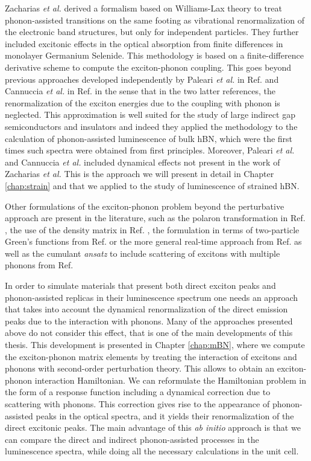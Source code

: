 Zacharias \textit{et al.} derived a formalism based on Williams-Lax theory\cite{williams1951theoretical,lax1952franck} to treat phonon-assisted transitions on the same footing as vibrational renormalization of the electronic band structures, but only for independent particles.\cite{zacharias2016one} They further included excitonic effects in the optical absorption from finite differences \cite{huang2021exciton} in monolayer Germanium Selenide. This methodology is based on a finite-difference derivative scheme to compute the exciton-phonon coupling. This goes beyond previous approaches developed independently by Paleari \textit{et al.} in Ref. \cite{paleari2019exciton} and Cannuccia \textit{et al.} in Ref. \cite{cannuccia2019theory} in the sense that in the two latter references, the renormalization of the exciton energies due to the coupling with phonon is neglected. This approximation is well suited for the study of large indirect gap semiconductors and insulators and indeed they applied the methodology to the calculation of phonon-assisted luminescence of bulk hBN, which were the first times such spectra were obtained from first principles. Moreover, Paleari \textit{et al.} and Cannuccia \textit{et al.} included dynamical effects not present in the work of Zacharias \textit{et al.} This is the approach we will present in detail in Chapter \ref{chap:strain} and that we applied to the study of luminescence of strained hBN. 

Other formulations of the exciton-phonon problem beyond the perturbative approach are present in the literature, such as the polaron transformation in Ref. \cite{feldtmann2009phonon}, the use of the density matrix in Ref. \cite{brem2020phonon}, the formulation in terms of two-particle Green's functions from Ref. \cite{antonius2017theory} or the more general real-time approach from Ref. \cite{paleari2022exciton} as well as the cumulant \textit{ansatz} to include scattering of excitons with multiple phonons from Ref. \cite{cudazzo2020first} 

In order to simulate materials that present both direct exciton
peaks and phonon-assisted replicas in their luminescence spectrum one needs an approach that takes into account the dynamical renormalization of the direct emission peaks due
to the interaction with phonons. Many of the approaches presented above do not consider this effect, that is one of the main developments of this thesis.
This development is presented in Chapter \ref{chap:mBN}, where we compute the exciton-phonon matrix elements by treating the interaction of excitons and phonons with second-order perturbation theory. This allows to obtain an exciton-phonon interaction Hamiltonian. We can reformulate the Hamiltonian problem in the form of a response function including a dynamical correction due to scattering with phonons. This correction gives rise to the appearance of phonon-assisted peaks in the optical spectra, and it yields their renormalization of the direct excitonic peaks. The main advantage of this \textit{ab initio} approach is that we can compare the direct and indirect  phonon-assisted processes in the luminescence spectra, while doing all the necessary calculations in the unit cell.

